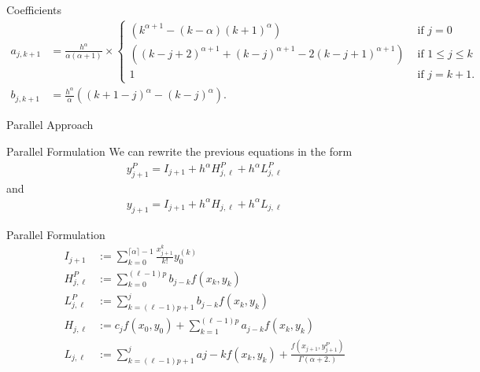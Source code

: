 \documentclass[pdf]{beamer}
\begin{document}
\begin{frame}{Coefficients}
\begin{align*}
    a_{j,k+1} &= \frac{h^\alpha}{\alpha(\alpha+1)} \times
    \begin{cases}
        (k^{\alpha+1}-(k-\alpha)(k+1)^\alpha) & \text{ if } j = 0 \\
        ((k-j+2)^{\alpha + 1} + (k-j)^{\alpha+1} - 2(k-j+1)^{\alpha+1}) & \text{ if } 1 \leq j \leq k \\
        1 & \text{ if } j = k + 1.
    \end{cases} \\
    b_{j,k+1} &= \frac{h^\alpha}{\alpha} \left( (k+1-j)^\alpha - (k-j)^\alpha \right).
\end{align*}
\end{frame}

\begin{frame}{Parallel Approach}
\resizebox{300pt}{!}{

}
\end{frame}
\begin{frame}{Parallel Formulation}
We can rewrite the previous equations in the form
\begin{align*}
y_{j+1}^P = I_{j+1} + h^\alpha H_{j,\ell}^P + h^\alpha L_{j,\ell}^P
\end{align*}
and
\begin{align*}
y_{j+1} = I_{j+1} + h^{\alpha} H_{j,\ell} + h^\alpha L_{j,\ell}
\end{align*}
\end{frame}
\begin{frame}{Parallel Formulation}
\begin{align*}
I_{j+1} & := \sum_{k=0}^{\lceil \alpha \rceil -1} \frac{x_{j+1}^k}{k!} y_0^{(k)} \\
H^P_{j,\ell} & := \sum_{k=0}^{(\ell-1)p} b_{j-k} f(x_k, y_k) \\
L_{j,\ell}^P & := \sum_{k=(\ell-1)p+1}^{j} b_{j-k} f(x_k,y_k) \\
H_{j,\ell} & := c_j f(x_0, y_0) + \sum_{k=1}^{(\ell - 1)p} a_{j-k}f(x_k, y_k) \\
L_{j,\ell} & := \sum_{k=(\ell-1)p + 1}^j a{j-k} f(x_k, y_k) + \frac{f(x_{j+1}, y^P_{j+1})}{\Gamma(\alpha + 2.)}
\end{align*}
\end{frame}
\end{document}
